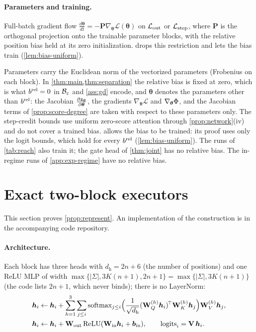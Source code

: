 \paragraph{Parameters and training.}

\begin{assumption}[Training]
\label{ass:gd}
Full-batch gradient flow $\tfrac{d\bm\theta}{dt}=-\mathbf P\nabla_{\bm\theta}\mathcal L(\bm\theta)$ on $\mathcal L_{\mathrm{out}}$ or $\mathcal L_{\mathrm{step}}$, where $\mathbf P$ is the orthogonal projection onto
the trainable parameter blocks, with the relative
position bias held at its zero initialization.  drops this restriction and lets the bias train (\cref{lem:bias-uniform}).
\end{assumption}

\label{rem:norms}Parameters carry the Euclidean norm of the vectorized parameters (Frobenius on
each block). In \cref{thm:main,thm:separation} the relative bias is fixed at zero, which is what $b^{\mathrm{rel}}=0$ in $\mathcal B_{\varepsilon}$ and
\cref{ass:gd} encode, and $\bm\theta$ denotes the parameters other than $b^{\mathrm{rel}}$: the Jacobian $\Jz$, the gradients $\nabla_{\bm\theta}\mathcal L$ and
$\nabla_{\bm\theta}\Phi$, and the Jacobian terms of \cref{prop:score-degree} are taken with respect to these parameters only. The step-credit bounds use uniform
zero-score attention through \cref{prop:network}(iv) and do not cover a trained bias.  allows the bias to be
trained: its proof uses only the logit bounds, which hold for every $b^{\mathrm{rel}}$ (\cref{lem:bias-uniform}). The runs of \cref{tab:reach} also train it; the gate head of \cref{thm:joint} has no relative bias. The in-regime runs of \cref{app:exp-regime} have no relative bias.


\section{Exact two-block executors}
\label{app:architectures}

This section proves \cref{prop:represent}. An implementation of the construction is in the accompanying code repository.

\paragraph{Architecture.}
\label{app:construction}
\label{app:model}
Each block has three heads with $d_{\mathrm h}=2n+6$ (the number of positions) and one ReLU MLP of width $\max\{|\Sigma|,3K(n+1),2n+1\}=\max\{|\Sigma|,3K(n+1)\}$ (the code lists $2n+1$, which never binds);
there is no LayerNorm:
\begin{align*}
 \bm h_i&\leftarrow \bm h_i+\sum_{h=1}^{3}\sum_{j\le i}\operatorname{softmax}_{j\le i}\Bigl(\tfrac{1}{\sqrt{d_{\mathrm h}}}(\mathbf W^{(h)}_Q\bm h_i)^{\!\top}\mathbf W^{(h)}_K\bm h_j\Bigr)\mathbf W^{(h)}_V\bm h_j,\\
 \bm h_i&\leftarrow \bm h_i+\mathbf W_{\mathrm{out}}\relu(\mathbf W_{\mathrm{in}}\bm h_i+\bm b_{\mathrm{in}}),\qquad \mathrm{logits}_i=\mathbf V\,\bm h_i .
\end{align*}

